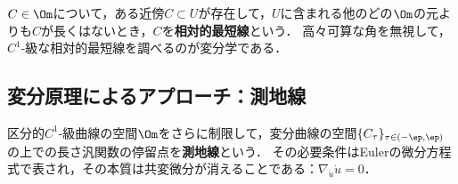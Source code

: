 \documentclass[uplatex,dvipdfmx]{jsreport}
\begin{document}
\begin{definition}
    $C\in\Om$について，ある近傍$C\subset U$が存在して，$U$に含まれる他のどの$\Om$の元よりも$C$が長くはないとき，$C$を\textbf{相対的最短線}という．
    高々可算な角を無視して，$C^1$-級な相対的最短線を調べるのが変分学である．
\end{definition}

\subsection{変分原理によるアプローチ：測地線}

\begin{tcolorbox}[colframe=ForestGreen, colback=ForestGreen!10!white,breakable,colbacktitle=ForestGreen!40!white,coltitle=black,fonttitle=\bfseries\sffamily,
title=]
    区分的$C^1$-級曲線の空間$\Om$をさらに制限して，変分曲線の空間$\{C_\tau\}_{\tau\in(-\ep,\ep)}$の上での長さ汎関数の停留点を\textbf{測地線}という．
    その必要条件はEulerの微分方程式で表され，その本質は共変微分が消えることである：$\nabla_{\dot{u}}\dot{u}=0$．
\end{tcolorbox}
\end{document}
